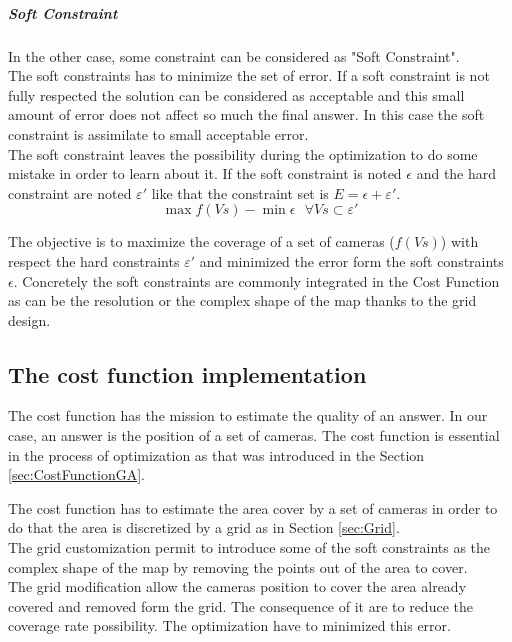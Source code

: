  \subparagraph{Soft Constraint}
 In the other case, some constraint can be considered as "Soft Constraint".\\ 
 The soft constraints has to minimize the set of error. If a soft constraint is not fully respected the solution can be considered as acceptable and this small amount of error does not affect so much the final answer. In this case the soft constraint is assimilate to small acceptable error. \\
 The soft constraint leaves the possibility during the optimization to do some mistake in order to learn about it.  
 If the soft constraint is noted $\epsilon$ and the hard constraint are noted $ \varepsilon '$ like that the constraint set is $E=\epsilon+\varepsilon'$.\\
 
  \begin{equation}\label{eq:constraintEpsilon}
 	\max f(Vs) - \min \epsilon  \mbox{  } \forall Vs \subset \varepsilon'
 \end{equation}
 
The objective is to maximize the coverage of a set of cameras ($f(Vs)$) with respect the hard constraints $\varepsilon'$ and minimized the error form the soft constraints $\epsilon$.
Concretely the soft constraints are commonly integrated in the Cost Function as can be the resolution or  the  complex shape of the map thanks to the grid design. 


\subsection{The cost function implementation} \label{sec:costFun}

The cost function has the mission to estimate the quality of an answer. In our case, an answer is the position  of a set of cameras. The cost function is essential in the process of optimization as that was introduced in the Section \ref{sec:CostFunctionGA}.

The cost function has to estimate the area cover by a set of cameras in order to do that the area is discretized by a grid as in Section \ref{sec:Grid}. \\
The grid customization permit to introduce some of the soft constraints as the complex shape of the map by removing the points out of the area to cover.  \\
The grid modification  allow the cameras position to cover the area already covered and removed form the grid. The consequence of it are to reduce the coverage rate possibility. The optimization have to minimized this error.

